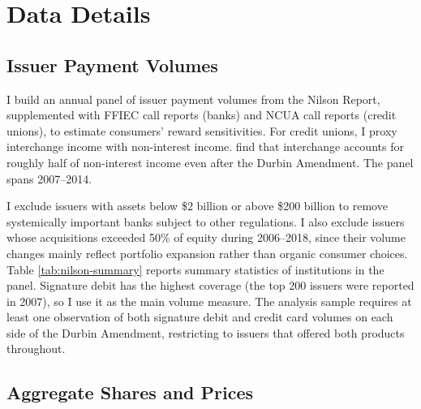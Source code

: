 \documentclass[main.tex]{subfiles}
\begin{document}
\section{Data Details}\label{sec:appendix-data}

\subsection{Issuer Payment Volumes}
\label{subsec:appendix-data-issuers}

I build an annual panel of issuer payment volumes from the Nilson Report, supplemented with FFIEC call reports (banks) and NCUA call reports (credit unions), to estimate consumers' reward sensitivities.
For credit unions, I proxy interchange income with non-interest income.
\textcite{CUToday2016} find that interchange accounts for roughly half of non-interest income even after the Durbin Amendment.
The panel spans 2007--2014.

I exclude issuers with assets below \$2 billion or above \$200 billion to remove systemically important banks subject to other regulations.
I also exclude issuers whose acquisitions exceeded 50\% of equity during 2006--2018, since their volume changes mainly reflect portfolio expansion rather than organic consumer choices. 
Table \ref{tab:nilson-summary} reports summary statistics of institutions in the panel.
Signature debit has the highest coverage (the top 200 issuers were reported in 2007), so I use it as the main volume measure.
The analysis sample requires at least one observation of both signature debit and credit card volumes on each side of the Durbin Amendment, restricting to issuers that offered both products throughout.

\subsection{Aggregate Shares and Prices}
\end{document}
